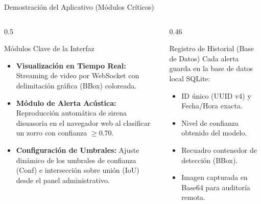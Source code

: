 \documentclass[10pt,aspectratio=169]{beamer}
\begin{document}
\begin{frame}{Demostración del Aplicativo (Módulos Críticos)}
  \begin{columns}[T]
    \begin{column}{0.5\textwidth}
      \begin{block}{Módulos Clave de la Interfaz}
        \small
        \begin{itemize}
          \item \textbf{Visualización en Tiempo Real:} Streaming de video por WebSocket con delimitación gráfica (BBox) coloreada.
          \item \textbf{Módulo de Alerta Acústica:} Reproducción automática de sirena disuasoria en el navegador web al clasificar un zorro con confianza $\ge 0.70$.
          \item \textbf{Configuración de Umbrales:} Ajuste dinámico de los umbrales de confianza (Conf) e intersección sobre unión (IoU) desde el panel administrativo.
        \end{itemize}
      \end{block}
    \end{column}
    
    \begin{column}{0.46\textwidth}
      \begin{block}{Registro de Historial (Base de Datos)}
        \small
        Cada alerta guarda en la base de datos local SQLite:
        \begin{itemize}
          \scriptsize
          \item ID único (UUID v4) y Fecha/Hora exacta.
          \item Nivel de confianza obtenido del modelo.
          \item Recuadro contenedor de detección (BBox).
          \item Imagen capturada en Base64 para auditoría remota.
        \end{itemize}
      \end{block}
    \end{column}
  \end{columns}
\end{frame}
\end{document}
